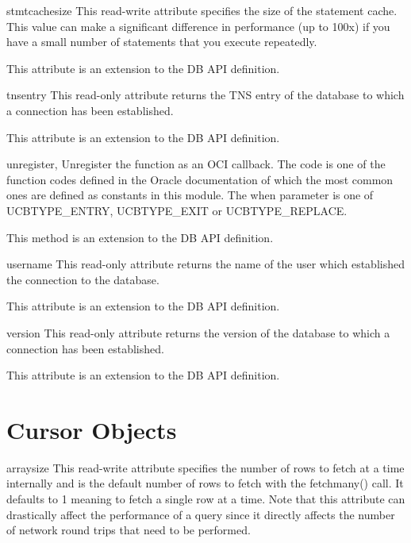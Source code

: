 \documentclass{manual}
\begin{document}
\begin{datadesc}{stmtcachesize}
  This read-write attribute specifies the size of the statement cache. This
  value can make a significant difference in performance (up to 100x) if you
  have a small number of statements that you execute repeatedly.

   This attribute is an extension to the DB API definition.
\end{datadesc}

\begin{datadesc}{tnsentry}
  This read-only attribute returns the TNS entry of the database to which a
  connection has been established.

   This attribute is an extension to the DB API definition.
\end{datadesc}

\begin{funcdesc}{unregister}{, }
  Unregister the function as an OCI callback. The code is one of the function
  codes defined in the Oracle documentation of which the most common ones are
  defined as constants in this module. The when parameter is one of
  UCBTYPE_ENTRY, UCBTYPE_EXIT or UCBTYPE_REPLACE.

   This method is an extension to the DB API definition.
\end{funcdesc}

\begin{datadesc}{username}
  This read-only attribute returns the name of the user which established the
  connection to the database.

   This attribute is an extension to the DB API definition.
\end{datadesc}

\begin{datadesc}{version}
  This read-only attribute returns the version of the database to which a
  connection has been established.

   This attribute is an extension to the DB API definition.
\end{datadesc}

\chapter{Cursor Objects\label{cursorobj}}

\begin{datadesc}{arraysize}
  This read-write attribute specifies the number of rows to fetch at a time
  internally and is the default number of rows to fetch with the fetchmany()
  call. It defaults to 1 meaning to fetch a single row at a time. Note that
  this attribute can drastically affect the performance of a query since it
  directly affects the number of network round trips that need to be performed.
\end{datadesc}
\end{document}
